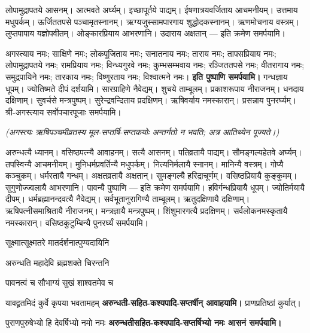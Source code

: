 लोपामुद्रापतये आसनम्। आत्मवते अर्घ्यम्। इच्छापूर्तये पाद्यम्।
ईषणात्रयवर्जिताय आचमनीयम्। उत्तमाय मधुपर्कम्। ऊर्जिततपसे
पञ्चामृतस्नानम्। ऋग्यजुस्सामपारगाय शुद्धोदकस्नानम्। ऋणमोचनाय वस्त्रम्।
लुप्तपापाय यज्ञोपवीतम्। ओङ्कारप्रियाय आभरणानि। उदाराय अक्षतान् — इति
क्रमेण समर्पयामि।

अगस्त्याय नमः; साक्षिणे नमः; लोकपूजिताय नमः; सनातनाय नमः; ताराय नमः; तापसप्रियाय नमः; लोपामुद्रापतये नमः; रामप्रियाय नमः; विन्ध्यगुरवे नमः; कुम्भसम्भवाय नमः; रञ्जिततपसे नमः; वीतरागाय नमः; समुद्रपायिने नमः; तारकाय नमः; विष्णुरताय नमः; विश्वात्मने नमः।
\textbf{इति पुष्पाणि समर्पयामि।} गन्धज्ञाय धूपम्। ज्योतिष्मते दीपं दर्शयामि।
सारग्राहिणे नैवेद्यम्। शुचये ताम्बूलम्। प्रकाशरूपाय नीराजनम्। धनदाय दक्षिणाम्।
सुवर्चसे मन्त्रपुष्पम्। सुरेन्द्रवन्दिताय प्रदक्षिणम्। ऋषिवर्याय नमस्कारान्।
प्रसन्नाय पुनरर्घ्यम्। श्री-अगस्त्याय सर्वोपचारपूजाः समर्पयामि।

\emph{(अगस्त्यः ऋषिपञ्चमीव्रतस्य मूल-सप्तर्षि-सप्तकयोः अन्तर्गतो न भवति; अत्र
आतिथ्येन पूज्यते।)}

अरुन्धत्यै ध्यानम्। वसिष्ठपत्न्यै आवाहनम्। सत्यै आसनम्। पतिव्रतायै पाद्यम्।
सौमङ्गल्यहेतवे अर्घ्यम्। तपस्विन्यै आचमनीयम्। मुनिधर्मप्रवर्तिन्यै मधुपर्कम्।
नित्यनिर्मलायै स्नानम्। मानिन्यै वस्त्रम्। गोप्यै कञ्चुकम्। धर्मरतायै गन्धम्।
अक्षतव्रतायै अक्षतान्। सुमङ्गल्यै हरिद्राचूर्णम्। वसिष्ठप्रियायै कुङ्कुमम्।
सुगुणोज्ज्वलायै आभरणानि। पावन्यै पुष्पाणि — इति क्रमेण समर्पयामि।
हविर्गन्धप्रियायै धूपम्। ज्योतिर्मयायै दीपम्। धर्मब्रह्मानन्दवत्यै नैवेद्यम्।
सर्वभूतानुरागिण्यै ताम्बूलम्। ऋतुदक्षिणायै दक्षिणाम्। ऋषिपत्नीसमाश्रितायै
नीराजनम्। मन्त्रज्ञायै मन्त्रपुष्पम्। शिंशुमारगत्यै प्रदक्षिणम्।
सर्वलोकनमस्कृतायै नमस्कारान्। वसिष्ठकुटुम्बिन्यै पुनरर्घ्यं समर्पयामि।

{सूक्ष्मात्सूक्ष्मतरे मातर्दर्शनात्पुण्यदायिनि}

{अरुन्धति महादेवि ब्रह्मशक्ते चिरन्तनि}

{पावनत्वं च सौभाग्यं सुखं शाश्वतमेव च}



{यावद्व्रतमिदं कुर्वे कृपया भवतामहम्}
\textbf{अरुन्धती-सहित-कश्यपादि-सप्तर्षीन् आवाहयामि।} प्राणप्रतिष्ठां कुर्यात्।

{पुराणपुरुषेभ्यो हि देवर्षिभ्यो नमो नमः}
\textbf{अरुन्धतीसहित-कश्यपादि-सप्तर्षिभ्यो नमः आसनं समर्पयामि।}

